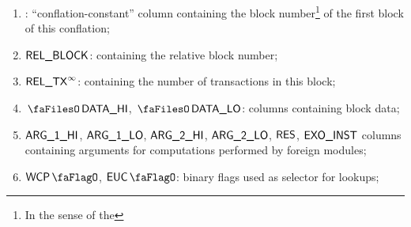 \begin{enumerate}[resume]
	\item \blockNumberOfFirstBlockInConflation{}:
		``conflation-constant'' column containing the block number\footnote{In the sense of the \evm{}} of the first block of this conflation;
	\item $\textsf{REL\_BLOCK}$:
		\ccc{} containing the relative block number;
	\item $\textsf{REL\_TX}^\infty$:
		\ccc{} containing the number of transactions in this block;
	\item $\blockDataHi$, $\blockDataLo$:
		columns containing block data;
	\item $\textsf{ARG}\textsf{\_1}\textsf{\_HI}$, $\textsf{ARG}\textsf{\_1}\textsf{\_LO}$, $\textsf{ARG}\textsf{\_2}\textsf{\_HI}$, $\textsf{ARG}\textsf{\_2}\textsf{\_LO}$, $\textsf{RES}$, $\textsf{EXO\_}\textsf{INST}$
		columns containing arguments for computations performed by foreign modules;
	\item $\wcpFlag$, $\eucFlag$:
		binary flags used as selector for lookups;
\end{enumerate}
